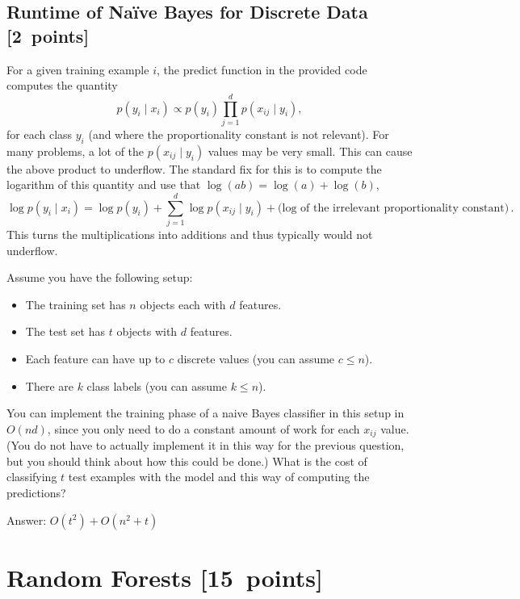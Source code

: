 \documentclass{article}
\newcommand{\blu}[1]{{\textcolor{blu}{#1}}}
\newenvironment{answer}{\par\begingroup\color{gre}Answer: }{\endgroup}
\let\ask\blu
\newcommand\pts[1]{\textcolor{pointscolour}{[#1~points]}}
\begin{document}
    \clearpage
    \subsection{Runtime of Na\"ive Bayes for Discrete Data \pts{2}}

    For a given training example $i$, the predict function in the provided code computes the quantity
    \[
    p(y_i \mid x_i) \propto p(y_i)\prod_{j=1}^d p(x_{ij} \mid y_i),
    \]
    for each class $y_i$ (and where the proportionality constant is not relevant). For many problems, a lot of the $p(x_{ij} \mid y_i)$ values may be very small. This can cause the above product to underflow. The standard fix for this is to compute the logarithm of this quantity and use that $\log(ab) = \log(a)+\log(b)$,
    \[
    \log p(y_i \mid x_i) = \log p(y_i) + \sum_{j=1}^d \log p(x_{ij} \mid y_i) + \text{(log of the irrelevant proportionality constant)} \, .
    \]
    This turns the multiplications into additions and thus typically would not underflow.

    Assume you have the following setup:
    \begin{itemize}
        \item The training set has $n$ objects each with $d$ features.
        \item The test set has $t$ objects with $d$ features.
        \item Each feature can have up to $c$ discrete values (you can assume $c \leq n$).
        \item There are $k$ class labels (you can assume $k \leq n$).
    \end{itemize}
    You can implement the training phase of a naive Bayes classifier in this setup in $O(nd)$, since you only need to do a constant amount of work for each $x_{ij}$ value. (You do not have to actually implement it in this way for the previous question, but you should think about how this could be done.)
    \ask{What is the cost of classifying $t$ test examples with the model and this way of computing the predictions?}
    \begin{answer}
    $O(t^2) + O(n^2 + t)$
    \end{answer}

    \clearpage
    \section{Random Forests \pts{15}}
\end{document}
